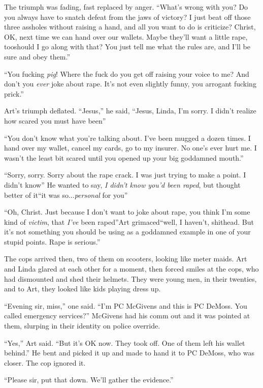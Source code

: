 The triumph was fading, fast replaced by anger. “What’s wrong with
you? Do you always have to snatch defeat from the jaws of victory?
I just beat off those three assholes without raising a hand, and
all you want to do is criticize? Christ, OK, next time we can hand
over our wallets. Maybe they’ll want a little rape, too{\dash}should I go
along with that? You just tell me what the rules are, and I’ll be
sure and obey them.”

“You fucking \emph{pig}! Where the fuck do you get off raising your
voice to me? And don’t you \emph{ever} joke about rape. It’s not
even slightly funny, you arrogant fucking prick.”

Art’s triumph deflated. “Jesus,” he said, “Jesus, Linda, I’m sorry.
I didn’t realize how scared you must have been{\dash}”

“You don’t know what you’re talking about. I’ve been mugged a dozen
times. I hand over my wallet, cancel my cards, go to my insurer. No
one’s ever hurt me. I wasn’t the least bit scared until you opened
up your big goddamned mouth.”

“Sorry, sorry. Sorry about the rape crack. I was just trying to
make a point. I didn’t know{\dash}” He wanted to say,
\emph{I didn’t know you’d been raped}, but thought better of it{\dash}“it
was so...\emph{personal} for you{\dash}”

“Oh, Christ. Just because I don’t want to joke about rape, you
think I’m some kind of \emph{victim}, that \emph{I’ve} been
raped”{\dash}Art grimaced{\dash}“well, I haven’t, shithead. But it’s not
something you should be using as a goddamned example in one of your
stupid points. Rape is serious.”

The cops arrived then, two of them on scooters, looking like meter
maids. Art and Linda glared at each other for a moment, then forced
smiles at the cops, who had dismounted and shed their helmets. They
were young men, in their twenties, and to Art, they looked like
kids playing dress up.

“Evening sir, miss,” one said. “I’m PC McGivens and this is PC
DeMoss. You called emergency services?” McGivens had his comm out
and it was pointed at them, slurping in their identity on police
override.

“Yes,” Art said. “But it’s OK now. They took off. One of them left
his wallet behind.” He bent and picked it up and made to hand it to
PC DeMoss, who was closer. The cop ignored it.

“Please sir, put that down. We’ll gather the evidence.”

